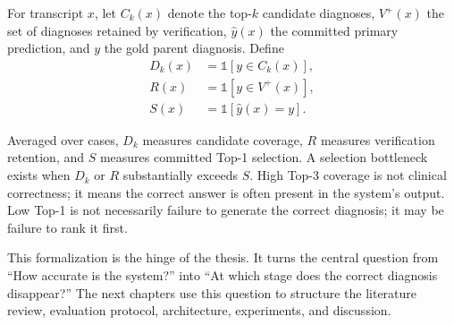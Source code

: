 For transcript $x$, let $C_k(x)$ denote the top-$k$ candidate diagnoses, $V^{+}(x)$ the set of diagnoses retained by verification, $\hat{y}(x)$ the committed primary prediction, and $y$ the gold parent diagnosis. Define
\begin{align}
D_k(x) &= \mathbb{1}[y \in C_k(x)],\\
R(x) &= \mathbb{1}[y \in V^{+}(x)],\\
S(x) &= \mathbb{1}[\hat{y}(x)=y].
\end{align}

Averaged over cases, $D_k$ measures candidate coverage, $R$ measures verification retention, and $S$ measures committed Top-1 selection. A selection bottleneck exists when $D_k$ or $R$ substantially exceeds $S$. High Top-3 coverage is not clinical correctness; it means the correct answer is often present in the system's output. Low Top-1 is not necessarily failure to generate the correct diagnosis; it may be failure to rank it first.

This formalization is the hinge of the thesis. It turns the central question from ``How accurate is the system?'' into ``At which stage does the correct diagnosis disappear?'' The next chapters use this question to structure the literature review, evaluation protocol, architecture, experiments, and discussion.
